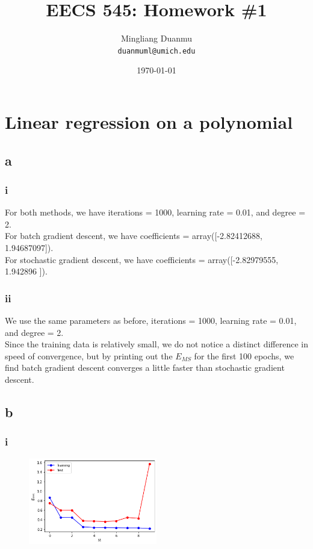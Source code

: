 \documentclass{article}
\title{EECS 545: Homework \#1} %
\author{Mingliang Duanmu\\ \texttt{duanmuml@umich.edu}} %
\date{\today} %
\begin{document}
\maketitle %

\section{Linear regression on a polynomial}

\subsection*{a}
\subsubsection*{i}
For both methods, we have iterations = 1000, learning rate = 0.01, and degree = 2. \\
For batch gradient descent, we have coefficients = array([-2.82412688,  1.94687097]). \\
For stochastic gradient descent, we have coefficients = array([-2.82979555,  1.942896  ]).

\subsubsection*{ii}
We use the same parameters as before, iterations = 1000, learning rate = 0.01, and degree = 2. \\
Since the training data is relatively small, we do not notice a distinct difference in speed of convergence, but by printing out the $E_{MS}$ for the first 100 epochs, we find batch gradient descent converges a little faster than stochastic gradient descent.

\subsection*{b}
\subsubsection*{i}
\begin{figure}[htbp]
    \centering
    \includegraphics[width=0.5\textwidth]{1bi.png}
\end{figure}
\end{document}
